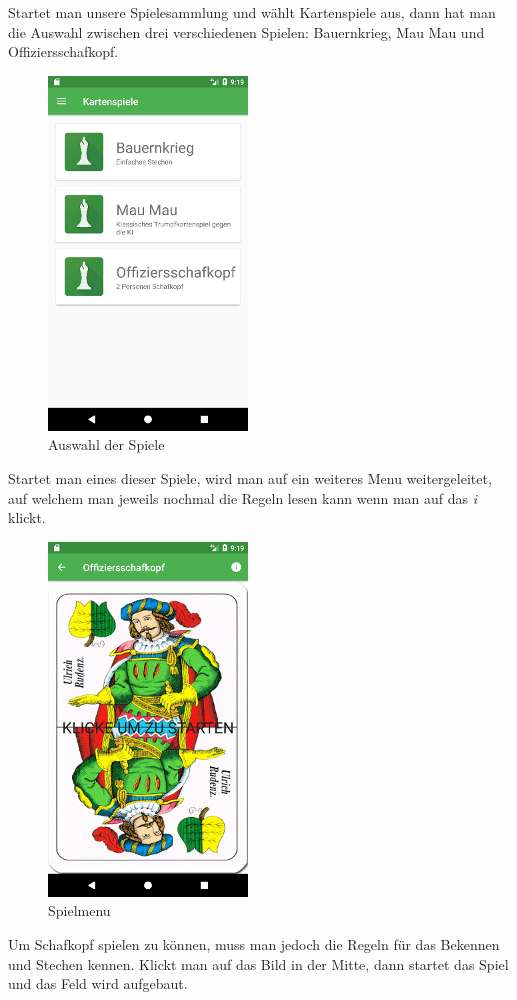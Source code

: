 Startet man unsere Spielesammlung und wählt Kartenspiele aus, dann hat man die Auswahl zwischen drei verschiedenen Spielen: Bauernkrieg, Mau Mau und Offiziersschafkopf.
\begin{figure}[h]
	\centering
	\includegraphics{resources/kartenscreens/auswahl}
	\caption{Auswahl der Spiele}
\end{figure}
Startet man eines dieser Spiele, wird man auf ein weiteres Menu weitergeleitet, auf welchem man jeweils nochmal die Regeln lesen kann wenn man auf das \emph{i} klickt.
\begin{figure}[h]
	\centering
	\includegraphics{resources/kartenscreens/menu}
	\caption{Spielmenu}
\end{figure}
Um Schafkopf spielen zu können, muss man jedoch die Regeln für das Bekennen und Stechen kennen. Klickt man auf das Bild in der Mitte, dann startet das Spiel und  das Feld wird aufgebaut. 

